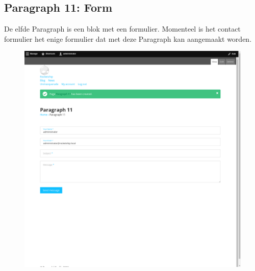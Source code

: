 \subsection{Paragraph 11: Form}
De elfde Paragraph is een blok met een formulier. Momenteel is het contact formulier het enige formulier dat met deze Paragraph kan aangemaakt worden.
\begin{figure}[h]
\includegraphics[width=1\textwidth]{img/p011.png}
\end{figure}


\clearpage
